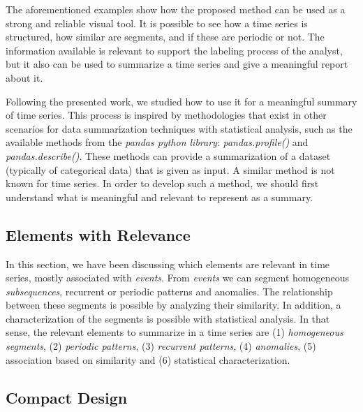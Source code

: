 The aforementioned examples show how the proposed method can be used as a strong and reliable visual tool. It is possible to see how a time series is structured, how similar are segments, and if these are periodic or not. The information available is relevant to support the labeling process of the analyst, but it also can be used to summarize a time series and give a meaningful report about it. 
\par
Following the presented work, we studied how to use it for a meaningful summary of time series. This process is inspired by methodologies that exist in other scenarios for data summarization techniques with statistical analysis, such as the available methods from the \textit{pandas python library}: \textit{pandas.profile()} and \textit{pandas.describe()}. These methods can provide a summarization of a dataset (typically of categorical data) that is given as input. A similar method is not known for time series. In order to develop such a method, we should first understand what is meaningful and relevant to represent as a summary.

\subsection{Elements with Relevance}

In this section, we have been discussing which elements are relevant in time series, mostly associated with \textit{events}. From \textit{events} we can segment homogeneous \textit{subsequences}, recurrent or periodic patterns and anomalies. The relationship between these segments is possible by analyzing their similarity. In addition, a characterization of the segments is possible with statistical analysis. In that sense, the relevant elements to summarize in a time series are (1) \textit{homogeneous segments}, (2) \textit{periodic patterns}, (3) \textit{recurrent patterns}, (4) \textit{anomalies}, (5) association based on similarity and (6) statistical characterization.

\subsection{Compact Design}

